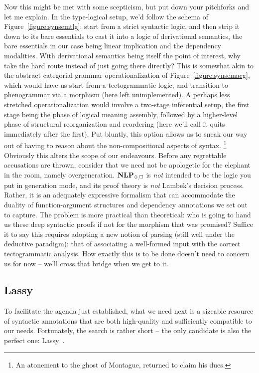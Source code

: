 Now this might be met with some scepticism, but put down your pitchforks and let me explain.
In the type-logical setup, we'd follow the schema of Figure~\ref{figure:synsemtlg}: start from a strict syntactic logic, and then strip it down to its bare essentials to cast it into a logic of derivational semantics, the bare essentials in our case being linear implication and the dependency modalities.
With derivational semantics being itself the point of interest, why take the hard route instead of just going there directly?
This is somewhat akin to the abstract categorial grammar operationalization of Figure~\ref{figure:synsemacg}, which would have us start from a tectogrammatic logic, and transition to phenogrammar via a morphism (here left unimplemented).
A perhaps less stretched operationalization would involve a two-stage inferential setup, the first stage being the phase of logical meaning assembly, followed by a higher-level phase of structural reorganization and reordering (here we'll call it quits immediately after the first).
Put bluntly, this option allows us to sneak our way out of having to reason about the non-compositional aspects of syntax.%
	\footnote{An atonement to the ghost of Montague, returned to claim his dues.}
Obviously this alters the scope of our endeavours.
Before any regrettable accusations are thrown, consider that we need not be apologetic for the elephant in the room, namely overgeneration.
$\NLP_{\ddia, \bx}$ is \textit{not} intended to be the logic you put in generation mode, and its proof theory is \textit{not} Lambek's decision process.
Rather, it is an adequately expressive formalism that can accommodate the duality of function-argument structures and dependency annotations we set out to capture.
The problem is more practical than theoretical: who is going to hand us these deep syntactic proofs if not for the morphism that was promised?
Suffice it to say this requires adopting a new notion of parsing (still well under the deductive paradigm): that of associating a well-formed input with the correct tectogrammatic analysis.
How exactly this is to be done doesn't need to concern us for now -- we'll cross that bridge when we get to it.

\subsection{Lassy}
To facilitate the agenda just established, what we need next is a sizeable resource of syntactic annotations that are both high-quality and sufficiently compatible to our needs.
Fortunately, the search is rather short -- the only candidate is also the perfect one: Lassy~\cite{van2013large}.

